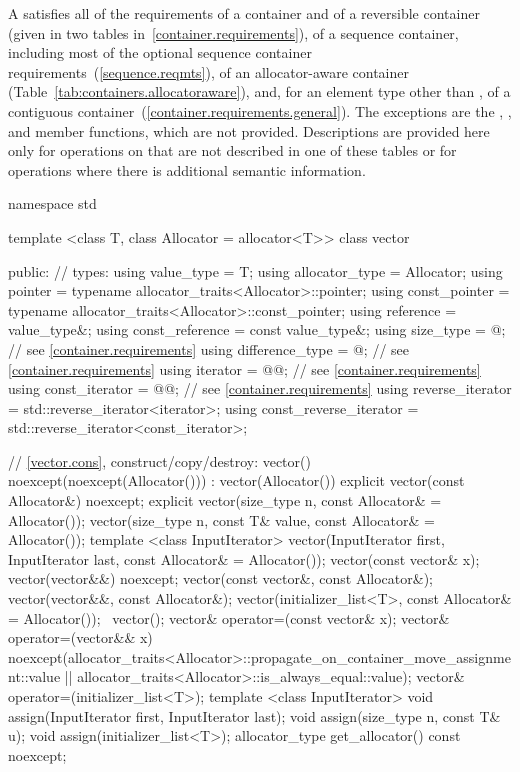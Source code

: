 \pnum
A  satisfies all of the requirements of a container and of a
reversible container (given in two tables in~\ref{container.requirements}), of a
sequence container, including most of the optional sequence container
requirements~(\ref{sequence.reqmts}), of an allocator-aware container
(Table~\ref{tab:containers.allocatoraware}),
and, for an element type other than ,
of a contiguous container~(\ref{container.requirements.general}).
The exceptions are the
, , and  member functions, which are not
provided. Descriptions are provided here only for operations on 
that are not described in one of these tables or for operations where there is
additional semantic information.

\begin{codeblock}
namespace std {
  template <class T, class Allocator = allocator<T>>
  class vector {
  public:
    // types:
    using value_type             = T;
    using allocator_type         = Allocator;
    using pointer                = typename allocator_traits<Allocator>::pointer;
    using const_pointer          = typename allocator_traits<Allocator>::const_pointer;
    using reference              = value_type&;
    using const_reference        = const value_type&;
    using size_type              = @\impdef@; // see \ref{container.requirements}
    using difference_type        = @\impdef@; // see \ref{container.requirements}
    using iterator               = @@; // see \ref{container.requirements}
    using const_iterator         = @@; // see \ref{container.requirements}
    using reverse_iterator       = std::reverse_iterator<iterator>;
    using const_reverse_iterator = std::reverse_iterator<const_iterator>;

    // \ref{vector.cons}, construct/copy/destroy:
    vector() noexcept(noexcept(Allocator())) : vector(Allocator()) { }
    explicit vector(const Allocator&) noexcept;
    explicit vector(size_type n, const Allocator& = Allocator());
    vector(size_type n, const T& value, const Allocator& = Allocator());
    template <class InputIterator>
      vector(InputIterator first, InputIterator last, const Allocator& = Allocator());
    vector(const vector& x);
    vector(vector&&) noexcept;
    vector(const vector&, const Allocator&);
    vector(vector&&, const Allocator&);
    vector(initializer_list<T>, const Allocator& = Allocator());
    ~vector();
    vector& operator=(const vector& x);
    vector& operator=(vector&& x)
      noexcept(allocator_traits<Allocator>::propagate_on_container_move_assignment::value ||
               allocator_traits<Allocator>::is_always_equal::value);
    vector& operator=(initializer_list<T>);
    template <class InputIterator>
      void assign(InputIterator first, InputIterator last);
    void assign(size_type n, const T& u);
    void assign(initializer_list<T>);
    allocator_type get_allocator() const noexcept;

}}
\end{codeblock}
